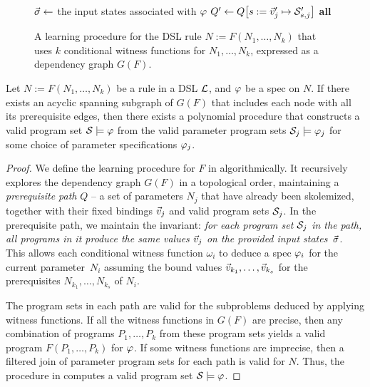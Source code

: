 \begin{figure}[p!]
\begin{fullpage}
\begin{algorithmic}[1]
            \Statex {}
            \Else
            \State $\vec{\sigma} \gets$ the input states associated with $\varphi$
             \label{alg:line:clusters}
            \State $Q' \gets Q\bigl[s := \vec{v}'_j \mapsto \mathcal{S}'_{s,j}\bigr]$
            \State \Yield \textbf{all} 
            \EndFor
            \EndIf
            \EndFunction
        \end{algorithmic}
        \caption{A learning procedure for the DSL rule $N := F(N_1, \dots, N_k)$ that uses $k$ conditional witness functions
        for $N_1, \dots, N_k$, expressed as a dependency graph $G(F)$.}
        \label{fig:prose:algorithm}
    \end{fullpage}
\end{figure}

\begin{theorem}
    Let $N := F(N_1, \dots, N_k)$ be a rule in a DSL $\mathcal{L}$, and $\varphi$ be a spec on $N$.
    If there exists an acyclic spanning subgraph of $G(F)$ that includes each node with all its prerequisite edges, then
    there exists a polynomial procedure that constructs a valid program set $\mathcal{S} \models \varphi$ from the valid
    parameter program sets $\mathcal{S}_j \models \varphi_j$ for some choice of parameter specifications $\varphi_j$.
    \label{thm:wf:cond}
\end{theorem}
\begin{proof}
    We define the learning procedure for $F$ in  algorithmically.
    It recursively explores the dependency graph $G(F)$ in a topological order, maintaining a \emph{prerequisite path}
    $Q$ -- a set of
    parameters $N_j$ that have already been skolemized, together with their fixed bindings $\vec{v}_j$ and valid program
    sets $\mathcal{S}_j$.
    In the prerequisite path, we maintain the invariant: \emph{for each program set $\mathcal{S}_j$ in the path, all programs
        in it produce the same values $\vec{v}_j$ on the provided input states~$\vec{\sigma}$}.
    This allows each conditional witness function $\omega_{i}$ to deduce a spec $\varphi_i$ for the current
    parameter~$N_i$ assuming the bound values $\vec{v}_{k_1}, \dots, \vec{v}_{k_s}$ for the prerequisites
    $N_{k_1}, \dots, N_{k_s}$ of $N_i$.

    The program sets in each path are valid for the subproblems deduced by applying witness functions.
    If all the witness functions in $G(F)$ are precise, then any combination of programs $P_1, \dots, P_k$ from these
    program sets yields a valid program $F(P_1, \dots, P_k)$ for $\varphi$.
    If some witness functions are imprecise, then a filtered join of parameter program sets for each path is valid
    for $N$.
    Thus, the procedure in  computes a valid program set $\mathcal{S} \models \varphi$.
\end{proof}

